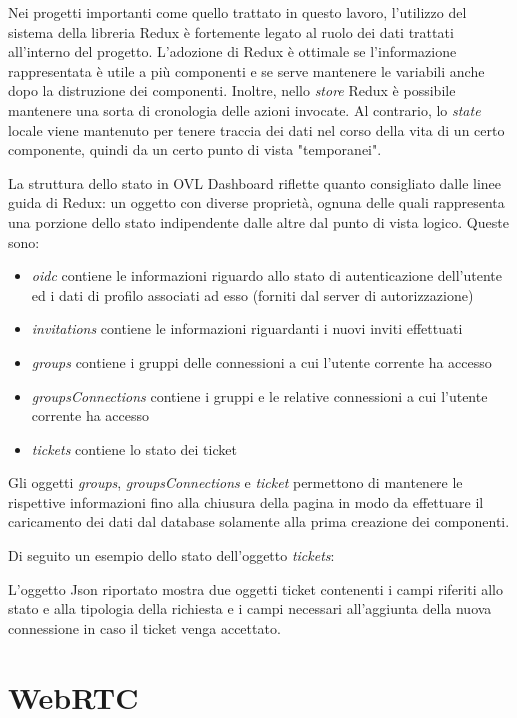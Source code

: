 Nei progetti importanti come quello trattato in questo lavoro, l'utilizzo del sistema della libreria Redux è fortemente legato al ruolo dei dati trattati all'interno del progetto. L'adozione di Redux è ottimale se l'informazione rappresentata è utile a più componenti e se serve mantenere le variabili anche dopo la distruzione dei componenti. Inoltre, nello \textit{store} Redux è possibile mantenere una sorta di cronologia delle azioni invocate. Al contrario, lo \textit{state} locale viene mantenuto per tenere traccia dei dati nel corso della vita di un certo componente, quindi da un certo punto di vista "temporanei".

La struttura dello stato in OVL Dashboard riflette quanto consigliato dalle
linee guida di Redux: un oggetto con diverse proprietà, ognuna delle quali rappresenta
una porzione dello stato indipendente dalle altre dal punto di vista logico. Queste sono:
\begin{itemize}
    \item \textit{oidc} contiene le informazioni riguardo allo stato di autenticazione dell'utente ed i dati di profilo associati ad esso (forniti dal server di autorizzazione) 
    \item \textit{invitations} contiene le informazioni riguardanti i nuovi inviti effettuati
    \item \textit{groups} contiene i gruppi delle connessioni a cui l'utente corrente ha accesso
    \item \textit{groupsConnections} contiene i gruppi e le relative connessioni a cui l'utente corrente ha accesso
    \item \textit{tickets} contiene lo stato dei ticket
\end{itemize}

Gli oggetti \textit{groups}, \textit{groupsConnections} e \textit{ticket} permettono di mantenere le rispettive informazioni fino alla chiusura della pagina in modo da effettuare il caricamento dei dati dal database solamente alla prima creazione dei componenti.

Di seguito un esempio dello stato dell'oggetto \textit{tickets}:



L'oggetto Json riportato mostra due oggetti ticket contenenti i campi riferiti allo stato e alla tipologia della richiesta e i campi necessari all'aggiunta della nuova connessione in caso il ticket venga accettato.

\section{WebRTC}
\label{sec:WebRTC}

